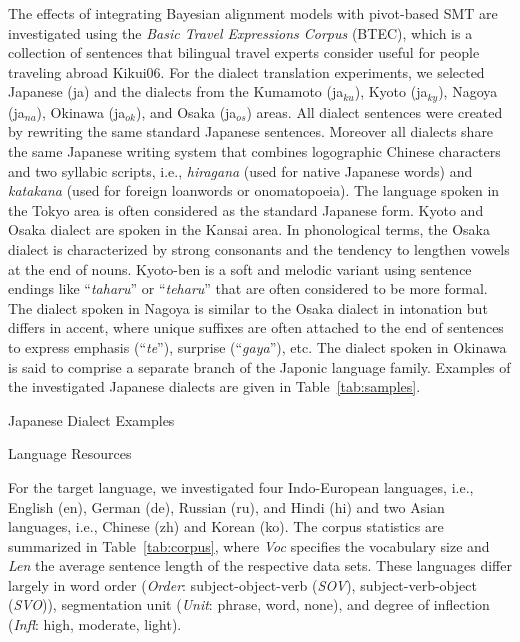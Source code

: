 \documentclass[english]{jnlp_1.4}
\renewcommand{\shortcite}{}
\begin{document}
 The effects of integrating Bayesian alignment models with pivot-based SMT are investigated
 using the {\em Basic Travel Expressions Corpus} (BTEC), which is a collection of sentences that bilingual
 travel experts consider useful for people traveling abroad \shortcite{Kikui06}.
 For the dialect translation experiments, we selected Japanese (ja)
 and the dialects from the Kumamoto (ja$_{ku}$), Kyoto (ja$_{ky}$), Nagoya (ja$_{na}$), Okinawa (ja$_{ok}$), and Osaka (ja$_{os}$) areas.
 All dialect sentences were created by rewriting the same standard Japanese sentences.
 Moreover all dialects share the same Japanese writing system that combines logographic Chinese characters and two syllabic scripts,
 i.e., {\em hiragana} (used for native Japanese words) and {\em katakana} (used for foreign loanwords or onomatopoeia).
 The language spoken in the Tokyo area is often considered as the standard Japanese form. Kyoto and Osaka dialect are spoken in the Kansai area.
 In phonological terms, the Osaka dialect is characterized by strong consonants and the tendency to lengthen vowels at the end of nouns.  
 Kyoto-ben is a soft and melodic variant using sentence endings like  ``{\em taharu}'' or ``{\em teharu}'' that are often considered to be more formal.
 The dialect spoken in Nagoya is similar to the Osaka dialect in intonation but differs in accent, where unique suffixes are often attached to the end of sentences
 to express emphasis (``{\em te}''), surprise (``{\em gaya}''), etc. The dialect spoken in Okinawa is said to comprise a separate branch of the Japonic language family.
 Examples of the investigated Japanese dialects are given in Table~\ref{tab:samples}.

\begin{table}[b]
  \caption{Japanese Dialect Examples}
  \label{tab:samples}

 \end{table}
 \begin{table}[b]
  \caption{Language Resources}
  \label{tab:corpus}

\end{table}



 For the target language, we investigated four Indo-European languages, i.e., English (en), German (de), Russian (ru), and Hindi (hi)
 and two Asian languages, i.e., Chinese (zh) and Korean (ko).
 The corpus statistics are summarized in Table~\ref{tab:corpus}, where {\em Voc} specifies the vocabulary size and {\em Len} the average sentence
 length of the respective data sets.
 These languages differ largely in word order (\textit{Order}: subject-object-verb ({\em SOV}), subject-verb-object (\textit{SVO})),
 segmentation unit ({\em Unit}: phrase, word, none), and degree of inflection ({\em Infl}: high, moderate, light).
\end{document}
